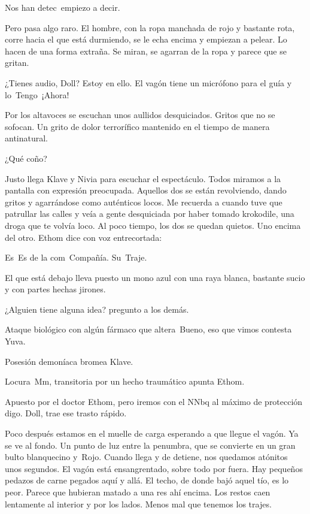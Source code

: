 \reply Nos han detec\textellipsis\ \pause empiezo a decir. 

Pero pasa algo raro. El hombre, con la ropa manchada de rojo y bastante rota, corre hacia el que está durmiendo, se le echa encima y empiezan a pelear. Lo hacen de una forma extraña. Se miran, se agarran de la ropa y parece que se gritan.

\reply ¿Tienes audio, Doll?
\reply Estoy en ello. El vagón tiene un micrófono para el guía y lo\textellipsis\  Tengo\textellipsis\  ¡Ahora!

Por los altavoces se escuchan unos aullidos desquiciados. Gritos que no se sofocan. Un grito de dolor terrorífico mantenido en el tiempo de manera antinatural.

\reply ¿Qué coño?

Justo llega Klave y Nivia para escuchar el espectáculo. Todos miramos a la pantalla con expresión preocupada. Aquellos dos se están revolviendo, dando gritos y agarrándose como auténticos locos. Me recuerda a cuando tuve que patrullar las calles y veía a gente desquiciada por haber tomado krokodile, una droga que te volvía loco. Al poco tiempo, los dos se quedan quietos. Uno encima del otro. Ethom dice con voz entrecortada:

\reply Es\textellipsis\ Es de la com\textellipsis\ Compañía. Su\textellipsis\ Traje.

El que está debajo lleva puesto un mono azul con una raya blanca, bastante sucio y con partes hechas jirones.

\reply ¿Alguien tiene alguna idea? \pause pregunto a los demás.

\reply Ataque biológico con algún fármaco que altera\textellipsis\ Bueno, eso que vi\-mos \pause contesta Yuva.

\reply Posesión demoníaca \pause bromea Klave.

\reply Locura\textellipsis\ Mm, transitoria por un hecho traumático \pause apunta Ethom.

\reply Apuesto por el doctor Ethom, pero iremos con el NNbq al máximo de protección \pause digo\pauseend. Doll, trae ese trasto rápido.

Poco después estamos en el muelle de carga esperando a que llegue el vagón. Ya se ve al fondo. Un punto de luz entre la penumbra, que se convierte en un gran bulto blanquecino y\textellipsis\ Rojo. Cuando llega y de detiene, nos quedamos atónitos unos segundos. El vagón está ensangrentado, sobre todo por fuera. Hay pequeños pedazos de carne pegados aquí y allá. El techo, de donde bajó aquel tío, es lo peor. Parece que hubieran matado a una res ahí encima. Los restos caen lentamente al interior y por los lados. Menos mal que tenemos los trajes.

